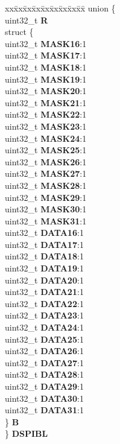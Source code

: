 \begin{DoxyCompactItemize}
\begin{tabbing}
\end{tabbing}\item 
\mbox{\label{structSIU__tag_a5fa4baeadac31913046cc7ea7409b8cd}} 
\begin{tabbing}
xx\=xx\=xx\=xx\=xx\=xx\=xx\=xx\=xx\=\kill
union \{\\
\>uint32\_t {\bfseries R}\\
\>struct \{\\
\>\>uint32\_t {\bfseries MASK16}:1\\
\>\>uint32\_t {\bfseries MASK17}:1\\
\>\>uint32\_t {\bfseries MASK18}:1\\
\>\>uint32\_t {\bfseries MASK19}:1\\
\>\>uint32\_t {\bfseries MASK20}:1\\
\>\>uint32\_t {\bfseries MASK21}:1\\
\>\>uint32\_t {\bfseries MASK22}:1\\
\>\>uint32\_t {\bfseries MASK23}:1\\
\>\>uint32\_t {\bfseries MASK24}:1\\
\>\>uint32\_t {\bfseries MASK25}:1\\
\>\>uint32\_t {\bfseries MASK26}:1\\
\>\>uint32\_t {\bfseries MASK27}:1\\
\>\>uint32\_t {\bfseries MASK28}:1\\
\>\>uint32\_t {\bfseries MASK29}:1\\
\>\>uint32\_t {\bfseries MASK30}:1\\
\>\>uint32\_t {\bfseries MASK31}:1\\
\>\>uint32\_t {\bfseries DATA16}:1\\
\>\>uint32\_t {\bfseries DATA17}:1\\
\>\>uint32\_t {\bfseries DATA18}:1\\
\>\>uint32\_t {\bfseries DATA19}:1\\
\>\>uint32\_t {\bfseries DATA20}:1\\
\>\>uint32\_t {\bfseries DATA21}:1\\
\>\>uint32\_t {\bfseries DATA22}:1\\
\>\>uint32\_t {\bfseries DATA23}:1\\
\>\>uint32\_t {\bfseries DATA24}:1\\
\>\>uint32\_t {\bfseries DATA25}:1\\
\>\>uint32\_t {\bfseries DATA26}:1\\
\>\>uint32\_t {\bfseries DATA27}:1\\
\>\>uint32\_t {\bfseries DATA28}:1\\
\>\>uint32\_t {\bfseries DATA29}:1\\
\>\>uint32\_t {\bfseries DATA30}:1\\
\>\>uint32\_t {\bfseries DATA31}:1\\
\>\} {\bfseries B}\\
\} {\bfseries DSPIBL}\\


\end{tabbing}
\end{DoxyCompactItemize}
